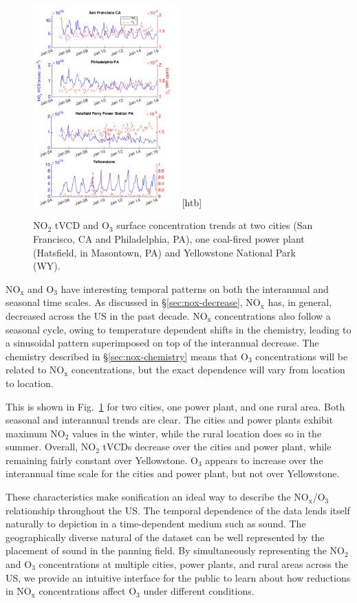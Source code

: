 \documentclass[a4paper,10pt,oneside]{article}
\newcommand{\ce}[1]{$\mathrm{#1}$}
\begin{document}
\begin{sloppy}
\begin{figure}
\centering
\includegraphics[width=0.5\textwidth]{figs/four-site-trends.png} [htb]
\caption{\ce{NO_2} tVCD and \ce{O_3} surface concentration trends at two cities (San Francisco, CA and Philadelphia, PA), one coal-fired power plant (Hatsfield, in Masontown, PA) and Yellowstone National Park (WY).}
\label{fig:trends}
\end{figure}

\ce{NO_x} and \ce{O_3} have interesting temporal patterns on both the interannual and seasonal time scales. As discussed in \S\ref{sec:nox-decrease}, \ce{NO_x} has, in general, decreased across the US in the past decade. \ce{NO_x} concentrations also follow a seasonal cycle, owing to temperature dependent shifts in the chemistry, leading to a sinusoidal pattern superimposed on top of the interannual decrease.  The chemistry described in \S\ref{sec:nox-chemistry} means that \ce{O_3} concentrations will be related to \ce{NO_x} concentrations, but the exact dependence will vary from location to location.

This is shown in Fig.~\ref{fig:trends} for two cities, one power plant, and one rural area. Both seasonal and interannual trends are clear. The cities and power plants exhibit maximum \ce{NO_2} values in the winter, while the rural location does so in the summer. Overall, \ce{NO_2} tVCDs decrease over the cities and power plant, while remaining fairly constant over Yellowstone. \ce{O_3} appears to increase over the interannual time scale for the cities and power plant, but not over Yellowstone. 

These characteristics make sonification an ideal way to describe the \ce{NO_x}/\ce{O_3} relationship throughout the US. The temporal dependence of the data lends itself naturally to depiction in a time-dependent medium such as sound. The geographically diverse natural of the dataset can be well represented by the placement of sound in the panning field. By simultaneously representing the \ce{NO_2} and \ce{O_3} concentrations at multiple cities, power plants, and rural areas across the US, we provide an intuitive interface for the public to learn about how reductions in \ce{NO_x} concentrations affect \ce{O_3} under different conditions.
	

\end{sloppy}
\end{document}
